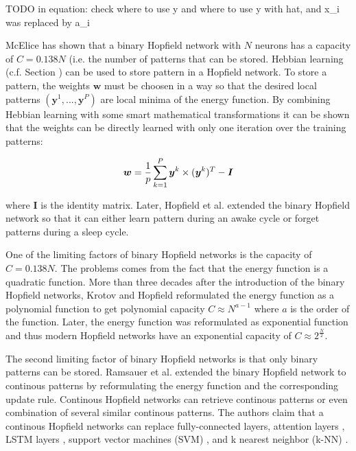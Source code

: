 TODO in equation: check where to use y and where to use y with hat, and x_i was replaced by a_i


McElice  has shown that a binary Hopfield network with \(N\) neurons has a capacity of \(C=0.138N\) (i.e. the number of patterns that can be stored.
Hebbian learning (c.f. Section ) can be used to store pattern in a Hopfield network.
To store a pattern, the weights \(\boldsymbol{w}\) must be choosen in a way so that the desired local patterns \((\boldsymbol{y}^1, ..., \boldsymbol{y}^P)\) are local minima of the energy function.
By combining Hebbian learning with some smart mathematical transformations it can be shown that the weights can be directly learned with only one iteration over the training patterns:

\begin{equation}\eqlbl{hf_5}
	\boldsymbol{w} = \frac{1}{p} \sum_{k=1}^{P} \boldsymbol{y}^k \times (\boldsymbol{y}^k)^T - \boldsymbol{I}
\end{equation}

where \(\boldsymbol{I}\) is the identity matrix.
Later, Hopfield et al.  extended the binary Hopfield network so that it can either learn pattern during an awake cycle or forget patterns during a sleep cycle.

One of the limiting factors of binary Hopfield networks is the capacity of \(C=0.138N\).
The problems comes from the fact that the energy function is a quadratic function.
More than three decades after the introduction of the binary Hopfield networks, Krotov and Hopfield  reformulated the energy function as a polynomial function to get polynomial capacity \(C\approx N^{a-1}\) where \(a\) is the order of the function.
Later, the energy function was reformulated as exponential function  and thus modern Hopfield networks have an exponential capacity of \(C\approx 2^{\frac{N}{2}}\).

The second limiting factor of binary Hopfield networks is that only binary patterns can be stored.
Ramsauer et al.  extended the binary Hopfield network to continous patterns by reformulating the energy function and the corresponding update rule.
Continous Hopfield networks can retrieve continous patterns or even combination of several similar continous patterns.
The authors claim that a continous Hopfield networks can replace fully-connected layers, attention layers \cite{10.5555/2969033.2969073}, LSTM layers \cite{Hochreiter_Schmidhuber_1997}, support vector machines (SVM) \cite{Cortes_Vapnik_1995}, and k nearest neighbor (k-NN) \cite{Cover_Hart_1967}.


